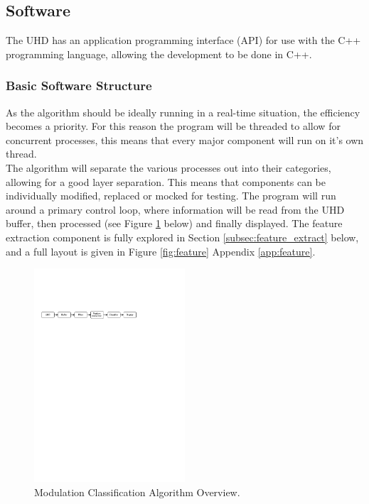 \documentclass[10pt,twocolumn]{witseiepaper}
\begin{document}
	\subsection{Software}
	The UHD has an application programming interface (API) for use with the C++ programming language, allowing the development to be done in C++.
		\subsubsection{Basic Software Structure}
			As the algorithm should be ideally running in a real-time situation, the efficiency becomes a priority. For this reason the program will be threaded to allow for concurrent processes, this means that every major component will run on it's own thread.\\[10pt]
			The algorithm will separate the various processes out into their categories, allowing for a good layer separation. This means that components can be individually modified, replaced or mocked for testing. The program will run around a primary control loop, where information will be read from the UHD buffer, then processed (see Figure \ref{fig:sw_overview} below) and finally displayed. The feature extraction component is fully explored in Section \ref{subsec:feature_extract} below, and a full layout is given in Figure \ref{fig:feature} Appendix \ref{app:feature}.
			\begin{figure}[h!]
				\centering
				\includegraphics[trim=1.2cm 31.5cm 9cm 8cm, clip=true,width=0.5\textwidth]{small.pdf}
				\caption{Modulation Classification Algorithm Overview.}
				\label{fig:sw_overview}
			\end{figure}
\end{document}

